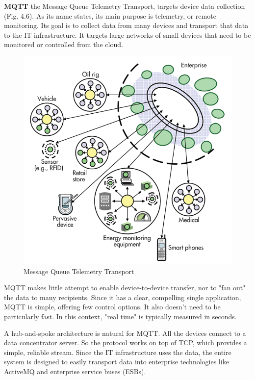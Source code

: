       \textbf{MQTT}
      \newline
      the Message Queue Telemetry Transport, targets device data collection (Fig. 4.6). As its name states, its main purpose is telemetry, or remote monitoring. Its goal is to collect data from many devices and transport that data to the IT infrastructure. It targets large networks of small devices that need to be monitored or controlled from the cloud.
      \begin{figure}[!ht]
      \centering
      \includegraphics[scale=0.6]{images/MQTT.png}   
      \caption[Message Queue Telemetry Transport]{Message Queue Telemetry Transport}
      \label{img:MQTT}                           
      \end{figure}
      MQTT makes little attempt to enable device-to-device transfer, nor to "fan out" the data to many recipients. Since it has a clear, compelling single application, MQTT is simple, offering few control options. It also doesn’t need to be particularly fast. In this context, "real time" is typically measured in seconds.

      A hub-and-spoke architecture is natural for MQTT. All the devices connect to a data concentrator server. So the protocol works on top of TCP, which provides a simple, reliable stream. Since the IT infrastructure uses the data, the entire system is designed to easily transport data into enterprise technologies like ActiveMQ and enterprise service buses (ESBs).

